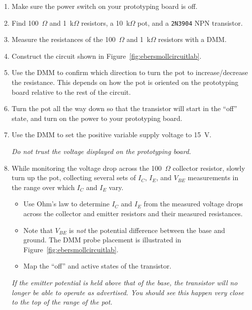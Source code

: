 \documentclass[11pt]{article}
\begin{document}
\begin{enumerate}
\item Make sure the power switch on your prototyping board is off.

\item Find 100~$\Omega$ and 1~k$\Omega$ resistors, a 10~k$\Omega$ pot,
  and a \texttt{2N3904} NPN transistor.

\item Measure the resistances of the 100~$\Omega$ and 1~k$\Omega$
  resistors with a DMM.
  
\item Construct the circuit shown in
  Figure~\ref{fig:ebersmollcircuitlab}. 

\item Use the DMM to confirm which direction to turn the pot to
  increase/decrease the resistance. This depends on how the pot is
  oriented on the prototyping board relative to the rest of the
  circuit.
  
\item Turn the pot all the way down so that the transistor will start
  in the ``off'' state, and turn on the power to your prototyping 
  board.

\item Use the DMM to set the positive variable supply voltage to
  15~V.

  \emph{Do not trust the voltage displayed on the prototyping board.}

\item While monitoring the voltage drop across the 100~$\Omega$
  collector resistor, slowly turn up the pot, collecting several sets
  of $I_C$, $I_E$, and $V_{BE}$ measurements in the range over which
  $I_C$ and $I_E$ vary.
  \begin{itemize}
  \item Use Ohm's law to determine $I_C$ and $I_E$ from the measured
    voltage drops across the collector and emitter resistors and their
    measured resistances.
  \item Note that $V_{BE}$ is \emph{not} the potential difference
    between the base and ground. The DMM probe placement is
    illustrated in Figure~\ref{fig:ebersmollcircuitlab}.
  \item Map the ``off'' and active states of the transistor. 
  \end{itemize}
  \emph{If the emitter potential is held above that of the base, the
    transistor will no longer be able to operate as advertised. You
    should see this happen very close to the top of the range of the
    pot.}


\end{enumerate}
\end{document}
